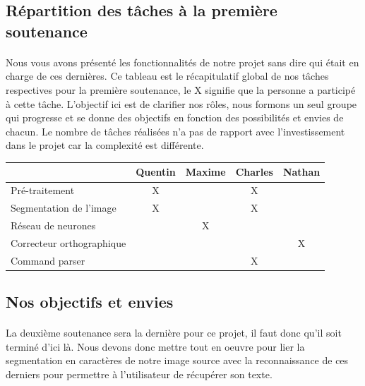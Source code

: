 \documentclass{article}
\begin{document}
\subsection{Répartition des tâches à la première soutenance}

\paragraph{} Nous vous avons présenté les fonctionnalités de notre projet sans dire qui était en charge de ces dernières. Ce tableau est le récapitulatif global de nos tâches respectives pour la première soutenance, le X signifie que la personne a participé à cette tâche. L'objectif ici est de clarifier nos rôles, nous formons un seul groupe qui progresse et se donne des objectifs en fonction des possibilités et envies de chacun. Le nombre de tâches réalisées n'a pas de rapport avec l'investissement dans le projet car la complexité est différente.
\begin{center}
\vspace*{0.2cm}
\begin{tabular}{|l|c|c|c|c|}
  \hline
  & Quentin & Maxime & Charles & Nathan \\
  \hline
  Pré-traitement & X &  & X &  \\
  \hline
  Segmentation de l'image & X &  & X &  \\
  \hline
  Réseau de neurones &  & X &  &  \\
  \hline
  Correcteur orthographique &  &  &  & X \\
  \hline
  Command parser &  &  & X &  \\
  \hline
\end{tabular}
\end{center}

\vspace*{1cm}

\subsection{Nos objectifs et envies}

\paragraph{}La deuxième soutenance sera la dernière pour ce projet, il faut donc qu'il soit terminé d'ici là. Nous devons donc mettre tout en oeuvre pour lier la segmentation en caractères de notre image source avec la reconnaissance de ces derniers pour permettre à l'utilisateur de récupérer son texte.
\end{document}
